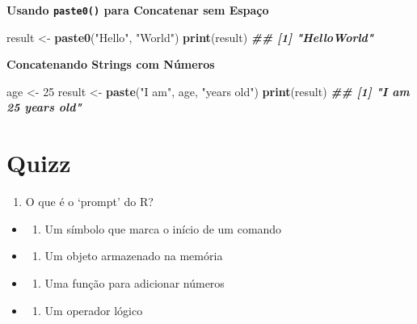 \documentclass[
]{book}
\newenvironment{Shaded}{\begin{snugshade}}{\end{snugshade}}
\newcommand{\DecValTok}[1]{\textcolor[rgb]{0.00,0.00,0.81}{#1}}
\newcommand{\DocumentationTok}[1]{\textcolor[rgb]{0.56,0.35,0.01}{\textbf{\textit{#1}}}}
\newcommand{\FunctionTok}[1]{\textcolor[rgb]{0.13,0.29,0.53}{\textbf{#1}}}
\newcommand{\NormalTok}[1]{#1}
\newcommand{\OtherTok}[1]{\textcolor[rgb]{0.56,0.35,0.01}{#1}}
\newcommand{\StringTok}[1]{\textcolor[rgb]{0.31,0.60,0.02}{#1}}
\providecommand{\tightlist}{%
  \setlength{\itemsep}{0pt}\setlength{\parskip}{0pt}}
\begin{document}
\textbf{Usando \texttt{paste0()} para Concatenar sem Espaço}

\begin{Shaded}
\begin{Highlighting}[]
\NormalTok{result }\OtherTok{\textless{}{-}} \FunctionTok{paste0}\NormalTok{(}\StringTok{"Hello"}\NormalTok{, }\StringTok{"World"}\NormalTok{)}
\FunctionTok{print}\NormalTok{(result)}
\DocumentationTok{\#\# [1] "HelloWorld"}
\end{Highlighting}
\end{Shaded}

\textbf{Concatenando Strings com Números}

\begin{Shaded}
\begin{Highlighting}[]
\NormalTok{age }\OtherTok{\textless{}{-}} \DecValTok{25}
\NormalTok{result }\OtherTok{\textless{}{-}} \FunctionTok{paste}\NormalTok{(}\StringTok{"I am"}\NormalTok{, age, }\StringTok{"years old"}\NormalTok{)}
\FunctionTok{print}\NormalTok{(result)}
\DocumentationTok{\#\# [1] "I am 25 years old"}
\end{Highlighting}
\end{Shaded}

\section{Quizz}\label{quizz}

\begin{enumerate}
\def\labelenumi{\arabic{enumi}.}
\tightlist
\item
  O que é o `prompt' do R?
\end{enumerate}

\begin{itemize}
\tightlist
\item
  \begin{enumerate}
  \def\labelenumi{\alph{enumi})}
  \tightlist
  \item
    Um símbolo que marca o início de um comando
  \end{enumerate}
\item
  \begin{enumerate}
  \def\labelenumi{\alph{enumi})}
  \setcounter{enumi}{1}
  \tightlist
  \item
    Um objeto armazenado na memória
  \end{enumerate}
\item
  \begin{enumerate}
  \def\labelenumi{\alph{enumi})}
  \setcounter{enumi}{2}
  \tightlist
  \item
    Uma função para adicionar números
  \end{enumerate}
\item
  \begin{enumerate}
  \def\labelenumi{\alph{enumi})}
  \setcounter{enumi}{3}
  \tightlist
  \item
    Um operador lógico
  \end{enumerate}
\end{itemize}
\end{document}
